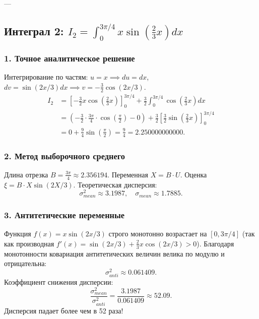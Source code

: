 \documentclass[11pt,a4paper]{article}
\begin{document}
---

\subsection{Интеграл 2: $I_2 = \int_0^{3\pi/4} x \sin\left(\frac{2}{3}x\right) dx$}

\subsubsection{1. Точное аналитическое решение}
Интегрирование по частям: $u = x \implies du = dx$, $dv = \sin(2x/3)dx \implies v = -\frac{3}{2}\cos(2x/3)$.
\begin{align}
    I_2 &= \left[ -\frac{3}{2} x \cos\left(\frac{2}{3}x\right) \right]_0^{3\pi/4} + \frac{3}{2} \int_0^{3\pi/4} \cos\left(\frac{2}{3}x\right) dx \nonumber \\
    &= \left( -\frac{3}{2} \cdot \frac{3\pi}{4} \cdot \cos\left(\frac{\pi}{2}\right) - 0 \right) + \frac{3}{2} \left[ \frac{3}{2} \sin\left(\frac{2}{3}x\right) \right]_0^{3\pi/4} \nonumber \\
    &= 0 + \frac{9}{4} \sin\left(\frac{\pi}{2}\right) = \frac{9}{4} = 2.250000000000.
\end{align}

\subsubsection{2. Метод выборочного среднего}
Длина отрезка $B = \frac{3\pi}{4} \approx 2.356194$. Переменная $X = B \cdot U$. Оценка $\xi = B \cdot X \sin(2X/3)$.
Теоретическая дисперсия:
\begin{equation}
    \sigma^2_{mean} \approx 3.1987, \quad \sigma_{mean} \approx 1.7885.
\end{equation}

\subsubsection{3. Антитетические переменные}
Функция $f(x) = x \sin(2x/3)$ строго монотонно возрастает на $[0, 3\pi/4]$ (так как производная $f'(x) = \sin(2x/3) + \frac{2}{3}x\cos(2x/3) > 0$). Благодаря монотонности ковариация антитетических величин велика по модулю и отрицательна:
\begin{equation}
    \sigma^2_{anti} \approx 0.061409.
\end{equation}
Коэффициент снижения дисперсии:
\begin{equation}
    \frac{\sigma^2_{mean}}{\sigma^2_{anti}} = \frac{3.1987}{0.061409} \approx 52.09.
\end{equation}
Дисперсия падает более чем в 52 раза!
\end{document}
